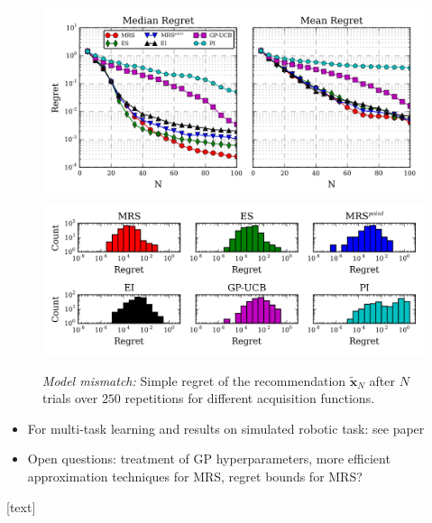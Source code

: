 \begin{block}{}
\begin{center}
\begin{figure}
\centering
\includegraphics[width=.8\textwidth]{../pics/empirical_comparison_mm} \\
\includegraphics[width=.8\textwidth]{../pics/hist_mm}
\caption{\emph{Model mismatch:} Simple regret of the recommendation $\mathbf{\tilde x}_N$ after $N$ trials over $250$ repetitions for different acquisition functions.}
\label{fig:empirical_comparison_mm}
\end{figure}

\end{center}
\end{block}

\begin{block}{}
\begin{itemize}
 \item For multi-task learning and results on simulated robotic task: see paper
 \item Open questions: treatment of GP hyperparameters, more efficient approximation techniques for MRS, regret bounds for MRS?
\end{itemize}
\end{block}

\begin{block}{}

\begin{multicols}{2}
{\scriptsize
{}[text]


}
\end{multicols}

\end{block}
